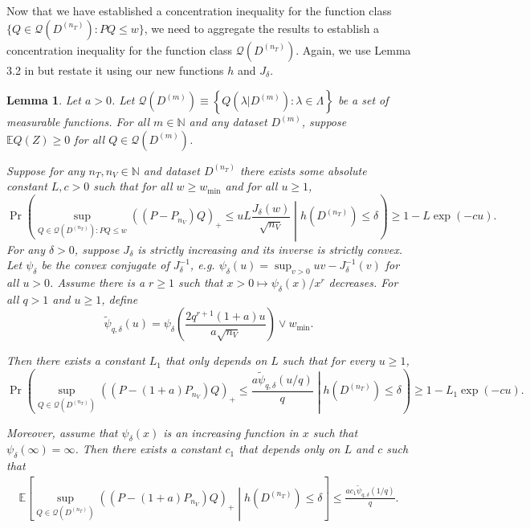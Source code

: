 \documentclass[10pt]{book}
\newtheorem{lemma}{Lemma}
\theoremstyle{definition}
\begin{document}
Now that we have established a concentration inequality for the function class $\{Q\in\mathcal{Q}(D^{(n_{T})}): PQ \le w\}$, we need to aggregate the results to establish a concentration inequality for the function class $\mathcal{Q}(D^{(n_{T})})$.
Again, we use Lemma 3.2 in \citet{lecue2012oracle} but restate it using our new functions $h$ and $J_\delta$.
\begin{lemma}
	Let $a>0$. Let $\mathcal{Q}(D^{(m)})\equiv\left\{ Q(\lambda|D^{(m)}):\lambda\in\Lambda\right\} $
	be a set of measurable functions.
	For all $m\in\mathbb{N}$ and any dataset $D^{(m)}$, suppose $\mathbb{E}Q(Z)\ge 0 $ for all $Q\in\mathcal{Q}\left(D^{(m)}\right)$.

	Suppose for any $n_{T},n_{V}\in\mathbb{N}$ and dataset $D^{(n_{T})}$
	there exists some absolute constant $L,c>0$ such that for all $w\ge w_{\min}$
	and for all $u\ge1$,
	\[
	\Pr\left(
	\sup_{Q\in\mathcal{Q}(D^{(n_{T})}): PQ \le w}
	\left(\left({P}-P_{n_{V}}\right)Q\right)_{+}\le uL\frac{J_{\delta}(w)}{\sqrt{n_{V}}}
	\middle |
	h\left(D^{(n_{T})}\right)\le\delta\right)
	\ge 1-L\exp(-cu).
	\]
	For any $\delta > 0$, suppose $J_{\delta}$ is strictly increasing and its inverse is strictly convex.
	Let $\psi_{\delta}$ be the convex conjugate of $J_{\delta}^{-1}$,
	e.g. $\psi_{\delta}(u)=\sup_{v>0}uv-J_{\delta}^{-1}(v)$ for all $u>0$.
	Assume there is a $r\ge1$ such that $x>0\mapsto\psi_\delta(x)/x^{r}$ decreases.
	For all $q>1$ and $u\ge1$, define
	\[
	\tilde \psi_{q,\delta}(u)=\psi_{\delta}\left(\frac{2q^{r+1}(1+a)u}{a\sqrt{n_{V}}}\right)\vee w_{\min}.
	\]
	
	
	Then there exists a constant $L_{1}$ that only depends on $L$ such
	that for every $u\ge1$,
	\[
	\Pr\left(
	\sup_{Q\in\mathcal{Q}(D^{(n_{T})})}
	\left(\left({P}-(1+a)P_{n_{V}}\right)Q\right)_{+}
	\le \frac{a \tilde{\psi}_{q,\delta}(u/q)}{q}
	\middle | h\left(D^{(n_{T})}\right)\le\delta
	\right)
	\ge 1-L_{1}\exp(-cu).
	\]
	
	
	Moreover, assume that $\psi_{\delta}(x)$ is an increasing function in $x$ such that $\psi_{\delta}(\infty)=\infty$.
	Then there exists a constant $c_{1}$ that depends only on $L$ and $c$ such that
	\begin{align}
	\mathbb{E}\left[\sup_{Q\in\mathcal{Q}(D^{(n_{T})})}
	\left(\left(P-(1+a)P_{n_{V}}\right)Q\right)_{+}
	\middle |
	h\left(D^{(n_{T})}\right)\le\delta
	\right]
	\le\frac{ac_{1} \tilde{\psi}_{q,\delta}(1/q)}{q}.
	\label{eq:lecue_exp_cond}
	\end{align}
	\label{lemma:lecue_prelim2}
\end{lemma}
\end{document}
